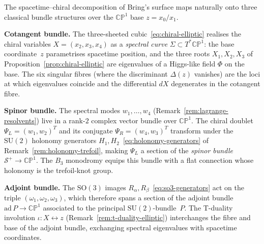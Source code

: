 \begin{remark}
\label{rem:chiral-bundles}
The spacetime--chiral decomposition of Bring's surface maps naturally onto
three classical bundle structures over the $\mathbb{CP}^1$ base $z=x_0/x_1$.

\medskip
\noindent\textbf{Cotangent bundle.}\;
The three-sheeted cubic~\eqref{eq:chiral-elliptic} realises the chiral
variables $X=(x_2,x_3,x_4)$ as a \emph{spectral curve}
$\Sigma\subset T^{*}\mathbb{CP}^1$: the base coordinate~$z$ parametrises
spacetime position, and the three roots $X_1,X_2,X_3$ of
Proposition~\ref{prop:chiral-elliptic} are eigenvalues of a Higgs-like
field $\Phi$ on the base.  The six singular fibres (where the discriminant
$\Delta(z)$ vanishes) are the loci at which eigenvalues coincide and the
differential $dX$ degenerates in the cotangent fibre.

\medskip
\noindent\textbf{Spinor bundle.}\;
The spectral modes $w_1,\dots,w_4$
(Remark~\ref{rem:lagrange-resolvents}) live in a rank-$2$ complex vector
bundle over $\mathbb{CP}^1$.  The chiral doublet
$\Psi_L=(w_1,w_2)^T$ and its conjugate $\Psi_R=(w_4,w_3)^T$ transform
under the $\mathrm{SU}(2)$ holonomy generators
$H_1,H_2$~\eqref{eq:holonomy-generators} of
Remark~\ref{rem:holonomy-trefoil}, making $\Psi_L$ a section of the
\emph{spinor bundle} $\mathcal{S}^{+}\to\mathbb{CP}^1$.  The $B_3$
monodromy equips this bundle with a flat connection whose holonomy is the
trefoil-knot group.

\medskip
\noindent\textbf{Adjoint bundle.}\;
The $\mathrm{SO}(3)$ images $R_\alpha,R_\beta$~\eqref{eq:so3-generators}
act on the triple $(\omega_1,\omega_2,\omega_3)$, which therefore spans a
section of the adjoint bundle $\mathrm{ad}\,P\to\mathbb{CP}^1$ associated
to the principal $\mathrm{SU}(2)$-bundle~$P$.  The T-duality involution
$\iota\colon X\leftrightarrow z$ (Remark~\ref{rem:t-duality-elliptic})
interchanges the fibre and base of the adjoint bundle, exchanging
spectral eigenvalues with spacetime coordinates.
\end{remark}

